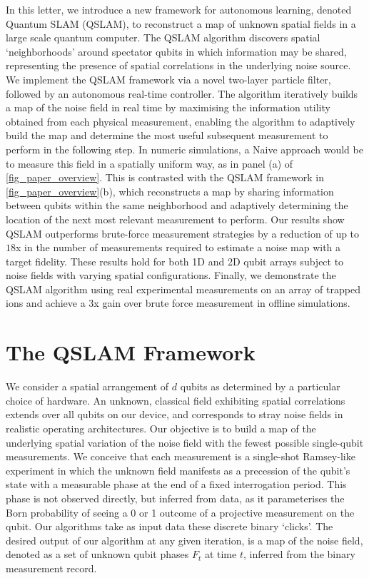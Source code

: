 \documentclass[reprint,longbibliography]{revtex4-1} %
\begin{document}
In this letter, we introduce a new framework for autonomous learning, denoted Quantum SLAM (QSLAM), to reconstruct a map of unknown spatial fields in a large scale quantum computer. The QSLAM algorithm discovers spatial `neighborhoods' around spectator qubits in which information may be shared, representing the presence of spatial correlations in the underlying noise source. We implement the QSLAM framework via a novel two-layer particle filter, followed by an autonomous real-time controller. The algorithm iteratively builds a map of the noise field  in real time by maximising the information utility obtained from each physical measurement, enabling the algorithm to adaptively build the map and determine the most useful subsequent measurement to perform in the following step. In numeric simulations, a Naive approach would be to measure this field in a spatially uniform way, as in panel (a) of \cref{fig_paper_overview}. This is contrasted with the QSLAM framework in \cref{fig_paper_overview}(b), which reconstructs a map by sharing information between qubits within the same neighborhood and adaptively determining the location of the next most relevant measurement to perform. Our results show QSLAM outperforms brute-force measurement strategies by a reduction of up to $18$x in the number of measurements required to estimate a noise map with a target fidelity.  These results hold for both 1D and 2D qubit arrays subject to noise fields with varying spatial configurations.  Finally, we demonstrate the QSLAM algorithm using real experimental measurements on an array of trapped ions and achieve a $3$x gain over brute force measurement in offline simulations.

\section{The QSLAM Framework}

We consider a spatial arrangement of $d$ qubits as determined by a particular choice of hardware. An unknown, classical field exhibiting spatial correlations extends over all qubits on our device, and corresponds to stray noise fields in realistic operating architectures.  Our objective is to build a map of the underlying spatial variation of the noise field with the fewest possible single-qubit measurements. We conceive that each measurement is  a single-shot Ramsey-like experiment in which the unknown field manifests as a precession of the qubit's state with a measurable phase at the end of a fixed interrogation period. This phase is not observed directly, but inferred from data, as it parameterises the Born probability of seeing a 0 or 1 outcome of a projective measurement on the qubit. Our algorithms take as input data these discrete binary `clicks'. The desired output of our algorithm at any given iteration, is a map of the noise field, denoted as a set of unknown qubit phases $F_t$ at time $t$, inferred from the binary measurement record.  
\end{document}
